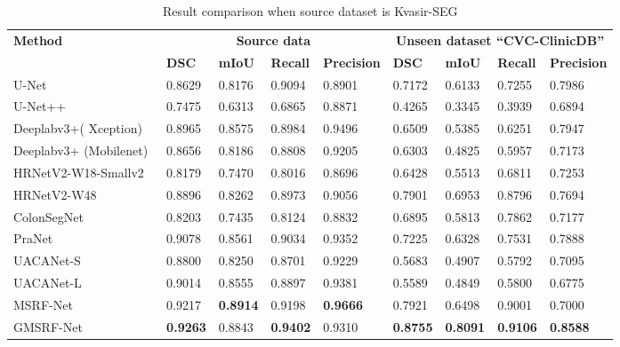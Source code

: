 \documentclass[conference]{IEEEtran}
\begin{document}
\begin{table*}[!t]
\centering
\footnotesize
\caption{Result comparison when source dataset is Kvasir-SEG}
\begin{tabular}{@{}l|l|l|l|l|l|l|l|l@{}}
\toprule
\multirow{2}{*}{\textbf{Method}} & \multicolumn{4}{|c|}{\bf Source data} & \multicolumn{4}{|c}{\bf Unseen dataset ``CVC-ClinicDB''} \\ 
& \textbf{DSC} & \textbf{mIoU} & \textbf{Recall} & \textbf{Precision} & \textbf{DSC} & \textbf{mIoU} & \textbf{Recall} & \textbf{Precision} \\
\hline
U-Net~\cite{ronneberger2015u} & 0.8629  & 0.8176 & 0.9094  &0.8901 & 0.7172 & 0.6133 & 0.7255 &0.7986  \\ \hline
U-Net++~\cite{zhou2019unet++} & 0.7475 & 0.6313 & 0.6865 & 0.8871 & 0.4265  & 0.3345 & 0.3939 & 0.6894 \\ \hline
Deeplabv3+( Xception)~\cite{chen2018encoder} & 0.8965 & 0.8575 & 0.8984 & 0.9496 & 0.6509 & 0.5385 & 0.6251 & 0.7947 \\ \hline

Deeplabv3+ (Mobilenet)~\cite{chen2018encoder} & 0.8656 & 0.8186 & 0.8808 & 0.9205 & 0.6303 & 0.4825 & 0.5957 & 0.7173 \\ \hline
HRNetV2-W18-Smallv2~\cite{Wang_2020} & 0.8179 & 0.7470 & 0.8016 & 0.8696 & 0.6428 & 0.5513 & 0.6811 & 0.7253\\ \hline
HRNetV2-W48~\cite{Wang_2020} & 0.8896 & 0.8262 & 0.8973 & 0.9056 & 0.7901 & 0.6953 & 0.8796 & 0.7694\\ \hline
ColonSegNet~\cite{jha2020real} & 0.8203 & 0.7435 & 0.8124 & 0.8832 & 0.6895 & 0.5813 & 0.7862 & 0.7177 \\ \hline
PraNet~\cite{fan2020pranet}  & 0.9078 & 0.8561 & 0.9034 & 0.9352 & 0.7225 & 0.6328 & 0.7531 & 0.7888 \\ \hline
UACANet-S~\cite{kim2021uacanet} & 0.8800 & 0.8250 & 0.8701 & 0.9229 & 0.5683 & 0.4907 & 0.5792 & 0.7095\\ \hline
UACANet-L~\cite{kim2021uacanet} & 0.9014 & 0.8555 & 0.8897 & 0.9381 & 0.5589 & 0.4849 & 0.5800 & 0.6775\\ \hline
MSRF-Net~\cite{srivastava2021msrf} & 0.9217 & \bf {0.8914} & 0.9198 & \textbf{0.9666} & 0.7921 & 0.6498 & 0.9001 & 0.7000\\ \hline
GMSRF-Net & \bf {0.9263} & 0.8843 & \bf {0.9402} & 0.9310 & \bf {0.8755} & \bf {0.8091} & \bf {0.9106} & \bf {0.8588} \\ \hline
\bottomrule
\end{tabular}
\label{tab:result1}
\end{table*}
\end{document}
